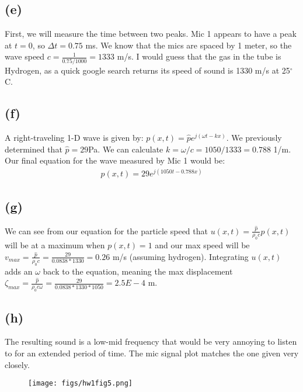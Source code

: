 \documentclass[12 pt]{article}
\begin{document}
\subsection*{(e)}
First, we will measure the time between two peaks. Mic 1 appears to have a peak at $t=0$, so $\Delta t=0.75$ ms. We know
that the mics are spaced by 1 meter, so the wave speed $c=\frac{1}{0.75/1000}=1333$ m/s. I would guess that the gas in
the tube is Hydrogen, as a quick google search returns its speed of sound is 1330 m/s at 25$^{\circ}$C.

\subsection*{(f)}
A right-traveling 1-D wave is given by: $p(x, t)=\hat{p}e^{j(\omega t-kx)}$. We previously determined that
$\hat{p}=29$Pa. We can calculate $k=\omega/c=1050/1333=0.788$ 1/m. Our final equation for the wave measured by Mic 1
would be:
\begin{align*}
    p(x, t)=29e^{j(1050t-0.788x)}
\end{align*}

\subsection*{(g)}
We can see from our equation for the particle speed that $u(x, t)=\frac{\hat{p}}{\rho_0c}p(x, t)$ will be at a maximum
when $p(x, t)=1$ and our max speed will be $v_{max}=\frac{\hat{p}}{\rho_0c}=\frac{29}{0.0838*1330}=0.26$ m/s (assuming
hydrogen). Integrating $u(x, t)$ adds an $\omega$ back to the equation, meaning the max displacement
$\zeta_{max}=\frac{\hat{p}}{\rho_0c\omega}=\frac{29}{0.0838*1330*1050}=2.5E-4$ m.

\subsection*{(h)}
The resulting sound is a low-mid frequency that would be very annoying to listen to for an extended period of time. The
mic signal plot matches the one given very closely.
\begin{figure}[H]
    \centering
    \texttt{[image: figs/hw1fig5.png]}
\end{figure} \par
\end{document}
